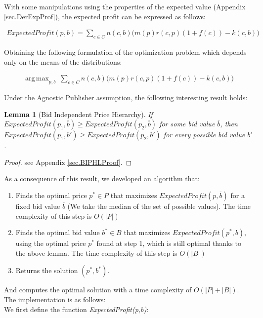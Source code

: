 \documentclass[11pt]{article} %
\DeclareMathOperator*{\argmax}{arg\,max}
\newtheorem*{lemma}{Lemma}
\begin{document}
With some manipulations using the properties of the expected value (Appendix \ref{sec.DerExpProf}), the expected profit can be expressed as follows:

\begin{align*}
ExpectedProfit(p,b)=\sum_{c \in C}{n(c,b)\Big(m(p)r(c,p)(1+f(c))-k(c,b)\Big)}
\end{align*}

Obtaining the following formulation of the optimization problem which depends only on the means of the distributions:

\begin{align*}
\argmax_{p,b}{\ \sum_{c \in C}{n(c,b)\Big(m(p)r(c,p)(1+f(c))-k(c,b)\Big)}}
\end{align*}

Under the Agnostic Publisher assumption, the following interesting result holds:

\begin{lemma}[Bid Independent Price Hierarchy]
If $ExpectedProfit(p_1,\overline b) \ge ExpectedProfit(p_2,\overline b)$ for some bid value $\overline b$,  then $ExpectedProfit(p_1, b') \ge ExpectedProfit(p_2, b')$  for every possible bid value $b'$.
\end{lemma}
\begin{proof}
see Appendix \ref{sec.BIPHLProof}.
\end{proof}

As a consequence of this result, we developed an algorithm that:
\begin{enumerate}
\item Finds the optimal price $p^*\in P$ that maximizes $ExpectedProfit(p,\overline b)$ for a fixed bid value $\overline b$ (We take the median of the set of possible values). The time complexity of this step is $O(|P|)$
\item Finds the optimal bid value $b^* \in B$ that maximizes $ExpectedProfit(p^*, b)$, using the optimal price $p^*$ found at step 1, which is still optimal thanks to the above lemma. The time complexity of this step is $O(|B|)$
\item Returns the solution $(p^*, b^*)$.
\end{enumerate}
And computes the optimal solution with a time complexity of $O(|P|+|B|)$.\\

The implementation is as follows:\\
We first define the function \textit{ExpectedProfit(p,b)}:
\inputminted{python}{code/step1_expected_profit.py}
\end{document}

